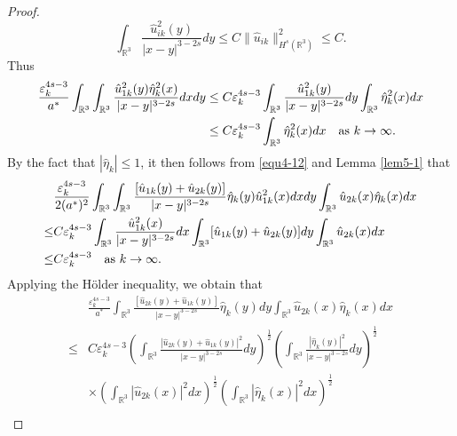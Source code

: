\documentclass[reqno, 11pt]{amsart} %
\numberwithin{equation}{section}
\begin{document}
\begin{proof}
\begin{equation}
			\int_{\mathbb{R}^{3}}\frac{\hat{u}_{ik}^{2}(y)}{|x-y|^{3-2s}}dy\leq C\|\hat{u}_{ik}\|_{H^{s}(\mathbb{R}^{3})}^{2}\leq C.
		\end{equation}
		Thus
		\begin{equation}\label{equ4-13}
			\begin{split}
				\frac{\varepsilon_{k}^{4s-3}}{a^{\ast}}\int_{\mathbb{R}^{3}}\int_{\mathbb{R}^{3}}\frac{\hat{u}_{1k}^{2}(y)\hat{\eta}_{k}^{2}(x)}{|x-y|^{3-2s}}dxdy&\leq C\varepsilon_{k}^{4s-3}	\int_{\mathbb{R}^{3}}\frac{\hat{u}_{1k}^{2}(y)}{|x-y|^{3-2s}}dy\int_{\mathbb{R}^{3}}\hat{\eta}_{k}^{2}(x)dx\\
				&\leq C\varepsilon_{k}^{4s-3}\int_{\mathbb{R}^{3}}\hat{\eta}_{k}^{2}(x)dx\quad \hbox{as $k\rightarrow\infty$}.
			\end{split}
		\end{equation}
		By the fact that $|\hat{\eta}_{k}|\leq1$, it then follows from \eqref{equ4-12} and Lemma \ref{lem5-1} that
		\begin{equation}\label{equ4-14}
			\begin{split}
				&\frac{\varepsilon_{k}^{4s-3}}{2(a^{\ast})^{2}}\int_{\mathbb{R}^{3}}\int_{\mathbb{R}^{3}}\frac{[\hat{u}_{1k}(y)+\hat{u}_{2k}(y)]}{|x-y|^{3-2s}}\hat{\eta}_{k}(y)\hat{u}^{2}_{1k}(x)dxdy\int_{\mathbb{R}^{3}}\hat{u}_{2k}(x)\hat{\eta}_{k}(x)dx\\
				\leq&C\varepsilon_{k}^{4s-3}\int_{\mathbb{R}^{3}}\frac{\hat{u}_{1k}^{2}(x)}{|x-y|^{3-2s}}dx\int_{\mathbb{R}^{3}}[\hat{u}_{1k}(y)+\hat{u}_{2k}(y)]dy\int_{\mathbb{R}^{3}}\hat{u}_{2k}(x)dx\\
				\leq& C\varepsilon_{k}^{4s-3}\quad \hbox{as $k\rightarrow\infty$}.
			\end{split}
		\end{equation}
		Applying the H\"{o}lder inequality, we obtain that
		\begin{equation}\label{equ4-15}
			\begin{split}
				&\frac{\varepsilon_{k}^{4s-3}}{a^{\ast}}\int_{\mathbb{R}^{3}}\frac{[\hat{u}_{2k}(y)+\hat{u}_{1k}(y)]}{|x-y|^{3-2s}}\hat{\eta}_{k}(y)dy\int_{\mathbb{R}^{3}}\hat{u}_{2k}(x)\hat{\eta}_{k}(x)dx\\
				\leq&C\varepsilon_{k}^{4s-3}\left(\int_{\mathbb{R}^{3}}\frac{|\hat{u}_{2k}(y)+\hat{u}_{1k}(y)|^{2}}{|x-y|^{3-2s}}dy \right)^{\frac{1}{2}}\left(\int_{\mathbb{R}^{3}}\frac{|\hat{\eta}_{k}(y)|^{2}}{|x-y|^{3-2s}}dy \right)^{\frac{1}{2}}\\
				&\times\left(\int_{\mathbb{R}^{3}}|\hat{u}_{2k}(x)|^{2}dx\right)^{\frac{1}{2}}\left(\int_{\mathbb{R}^{3}}|\hat{\eta}_{k}(x)|^{2}dx\right)^{\frac{1}{2}}\\

\end{split}
\end{equation}
\end{proof}
\end{document}
